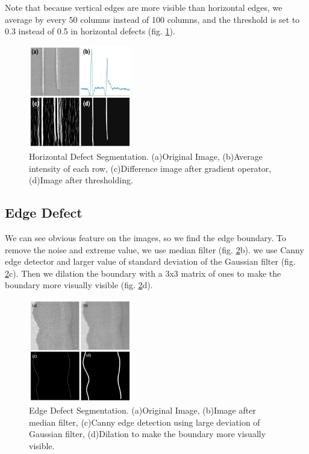 \documentclass[conference]{IEEEtran}
\begin{document}
\begin{CJK}{UTF8}{bsmi}
Note that because vertical edges are more visible than horizontal edges, we average by every 50 columns instead of 100 columns, and the threshold is set to 0.3 instead of 0.5 in horizontal defects (fig. \ref{fig:Vertical}).

\begin{figure}[!htbp]
\centerline{\includegraphics[width=0.4\textwidth]{../figures/Vertical.png}}
\caption{Horizontal Defect Segmentation. (a)Original Image, (b)Average intensity of each row, (c)Difference image after gradient operator, (d)Image after thresholding.}
\label{fig:Vertical}
\end{figure}

\subsection{Edge Defect}
We can see obvious feature on the images, so we find the edge boundary. To remove the noise and extreme value, we use median filter (fig. \ref{fig:Edge}b). we use Canny edge detector \cite{Canny} and larger value of standard deviation of the Gaussian filter (fig. \ref{fig:Edge}c). Then we dilation the boundary with a 3x3 matrix of ones to make the boundary more visually visible (fig. \ref{fig:Edge}d). 

\begin{figure}[!htbp]
\centerline{\includegraphics[width=0.4\textwidth]{../figures/Edge.png}}
\caption{Edge Defect Segmentation. (a)Original Image, (b)Image after median filter, (c)Canny edge detection using large deviation of Gaussian filter, (d)Dilation to make the boundary more visually visible.}
\label{fig:Edge}
\end{figure}


\end{CJK}
\end{document}
